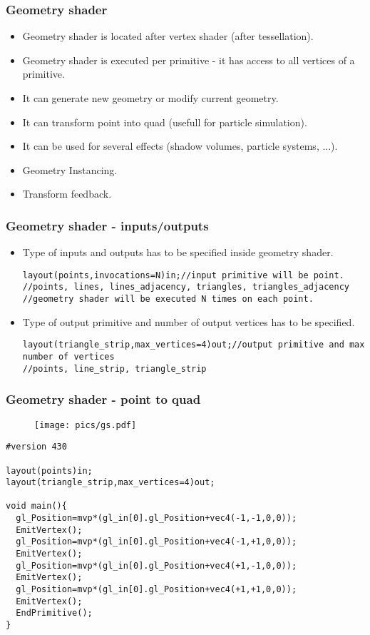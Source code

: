 \begin{frame}[fragile]
\frametitle{Geometry shader}
	\begin{itemize}
  \item Geometry shader is located after vertex shader (after tessellation).
	\item Geometry shader is executed per primitive - it has access to all vertices of a primitive.
	\item It can generate new geometry or modify current geometry.
  \item It can transform point into quad (usefull for particle simulation).
  \item It can be used for several effects (shadow volumes, particle systems, ...).
	\item Geometry Instancing.
	\item Transform feedback.
	\end{itemize}
\end{frame}

\begin{frame}[fragile]
\frametitle{Geometry shader - inputs/outputs}
	\begin{itemize}
	\item Type of inputs and outputs has to be specified inside geometry shader.
	{\scriptsize
	\begin{verbatim}
layout(points,invocations=N)in;//input primitive will be point.
//points, lines, lines_adjacency, triangles, triangles_adjacency
//geometry shader will be executed N times on each point.
	\end{verbatim}
	}
	\item Type of output primitive and number of output vertices has to be specified.
	{\scriptsize
	\begin{verbatim}
layout(triangle_strip,max_vertices=4)out;//output primitive and max number of vertices
//points, line_strip, triangle_strip
	\end{verbatim}
	}
	\end{itemize}
\end{frame}

\begin{frame}[fragile]
\frametitle{Geometry shader - point to quad}
	\begin{figure}[h]
		\texttt{[image: pics/gs.pdf]}
	\end{figure}

	{\scriptsize
	\begin{verbatim}
#version 430

layout(points)in;
layout(triangle_strip,max_vertices=4)out;

void main(){
  gl_Position=mvp*(gl_in[0].gl_Position+vec4(-1,-1,0,0));
  EmitVertex();
  gl_Position=mvp*(gl_in[0].gl_Position+vec4(-1,+1,0,0));
  EmitVertex();
  gl_Position=mvp*(gl_in[0].gl_Position+vec4(+1,-1,0,0));
  EmitVertex();
  gl_Position=mvp*(gl_in[0].gl_Position+vec4(+1,+1,0,0));
  EmitVertex();
  EndPrimitive();
}
	\end{verbatim}
	}
\end{frame}

